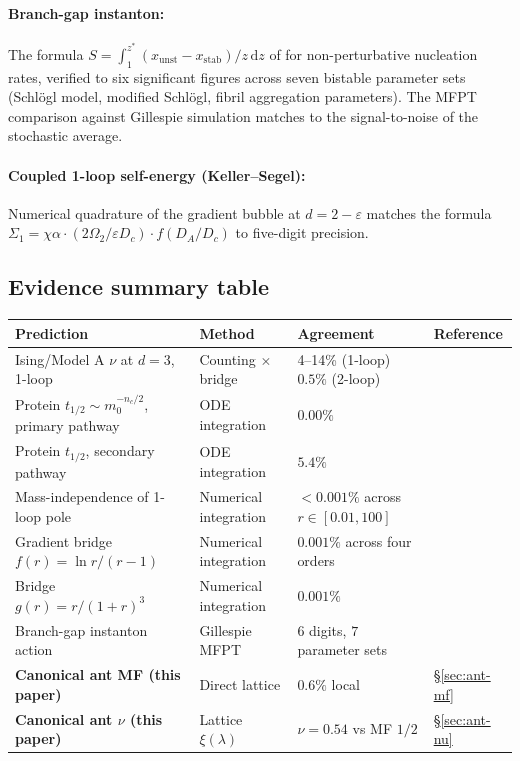 \documentclass[10pt,a4paper,twocolumn]{article}
\newcommand{\dd}{\mathrm{d}}
\theoremstyle{definition}
\begin{document}
\paragraph{Branch-gap instanton:}
The formula $S = \int_1^{z^*}(x_{\text{unst}}-x_{\text{stab}})/z\,\dd z$
of \citep{Amarteifio2026cfac} for non-perturbative nucleation
rates, verified to six significant figures across seven
bistable parameter sets (Schlögl model, modified Schlögl, fibril
aggregation parameters).  The MFPT comparison against Gillespie
simulation matches to the signal-to-noise of the stochastic
average.

\paragraph{Coupled 1-loop self-energy (Keller--Segel):}
Numerical quadrature of the gradient bubble at $d = 2 -
\varepsilon$ matches the formula
$\Sigma_1 = \chi\alpha \cdot (2\Omega_2/\varepsilon D_c) \cdot
f(D_A/D_c)$ to five-digit precision.

\subsection{Evidence summary table}

\begin{center}
\small
\renewcommand{\arraystretch}{1.3}
\begin{tabular}{@{}p{5.5cm}p{2.8cm}p{2.5cm}p{2.8cm}@{}}
\toprule
\textbf{Prediction}
  & \textbf{Method}
  & \textbf{Agreement}
  & \textbf{Reference} \\
\midrule
Ising/Model A $\nu$ at $d=3$, 1-loop
  & Counting $\times$ bridge
  & 4--14\% (1-loop) \newline $0.5\%$ (2-loop)
  & \citep{Amarteifio2026cfac} \\
Protein $t_{1/2} \sim m_0^{-n_c/2}$, primary pathway
  & ODE integration
  & $\mathbf{0.00\%}$
  & \citep{Amarteifio2026cfac} \\
Protein $t_{1/2}$, secondary pathway
  & ODE integration
  & $5.4\%$
  & \citep{Amarteifio2026cfac} \\
Mass-independence of 1-loop pole
  & Numerical integration
  & $< 0.001\%$ across $r\in[0.01,100]$
  & \citep{Amarteifio2026cfac} \\
Gradient bridge $f(r)=\ln r/(r-1)$
  & Numerical integration
  & $0.001\%$ across four orders
  & \citep{Amarteifio2026cfac} \\
Bridge $g(r)=r/(1+r)^3$
  & Numerical integration
  & $0.001\%$
  & \citep{Amarteifio2026cfac} \\
Branch-gap instanton action
  & Gillespie MFPT
  & $6$ digits, $7$ parameter sets
  & \citep{Amarteifio2026cfac,Amarteifio2026cfactheorem} \\
\midrule
\textbf{Canonical ant MF (this paper)}
  & Direct lattice
  & $\mathbf{0.6\%}$ local
  & \S\ref{sec:ant-mf} \\
\textbf{Canonical ant $\nu$ (this paper)}
  & Lattice $\xi(\lambda)$
  & $\nu=0.54$ vs MF $1/2$
  & \S\ref{sec:ant-nu} \\
\bottomrule
\end{tabular}
\end{center}
\end{document}
